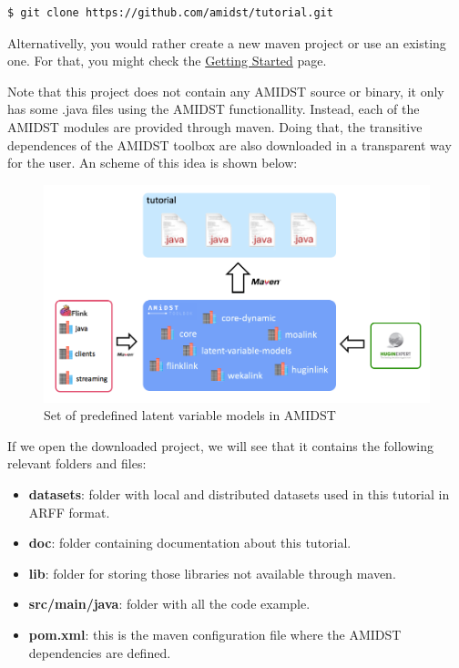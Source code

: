 \documentclass[10pt,a4paper]{article}
\begin{document}
\begin{verbatim}
$ git clone https://github.com/amidst/tutorial.git      
\end{verbatim}


Alternativelly, you would rather create a new maven project or use an existing one. For that, you might check the \href{../GettingStarted/index.html}{Getting Started} page.\newline 

Note that this project does not contain any AMIDST source or binary, it only has some .java files using the AMIDST functionallity. Instead, each of the AMIDST modules are provided through maven. Doing that, the transitive dependences of the AMIDST toolbox are also downloaded in a transparent way for the user. An scheme of this idea is shown below:

 
\begin{figure}[h!]
	\centering
	\includegraphics[width=13cm]{img/overview.png}
	\caption{Set of predefined latent variable models in AMIDST}
	\label{fig:lvmodels:amidstModels}	
\end{figure}


\newpage 
If we open the downloaded project, we will see that it contains the following relevant folders and files:

\begin{itemize}
	\item \textbf{datasets}: folder with local and distributed datasets used in this tutorial in ARFF format.
	\item \textbf{doc}: folder containing documentation about this tutorial.
	\item \textbf{lib}: folder for storing those libraries not available through maven.
	\item \textbf{src/main/java}: folder with all the code example.
	\item \textbf{pom.xml}: this is the maven configuration file where the AMIDST dependencies are defined.
\end{itemize}
\end{document}
